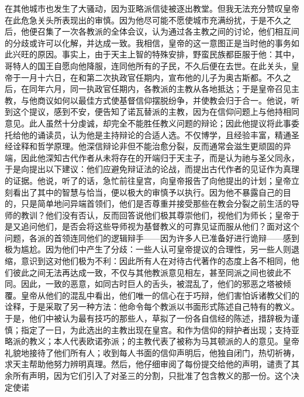 在其他城市也发生了大骚动，因为亚略派信徒被逐出教堂。但我无法充分赞叹皇帝在此危急关头所表现出的审慎。因为他尽可能不愿使城市充满纷扰，于是不久之后，他便召集了一次各教派的全体会议，认为通过各主教之间的讨论，他们相互间的分歧或许可以化解，并达成一致。我相信，皇帝的这一意图正是当时他的事务如此兴旺的原因。事实上，由于天主上智的特殊安排，野蛮民族都臣服于他：其中，哥特人的国王自愿向他降服，连同他所有的子民，不久后便在去世。在此关头，皇帝于一月十六日，在和第二次执政官任期内，宣布他的儿子为奥古斯都。不久之后，在同年六月，同一执政官任期内，各教派的主教从各地抵达；于是皇帝召见主教，与他商议如何以最佳方式使基督信仰摆脱纷争，并使教会归于合一。他说，听到这个提议，感到不安，便告知了诺瓦替派的主教，因为在信仰问题上与他持相同意见。此人虽然十分虔诚，却完全不能胜任教义问题的辩论；因此他提议将此事委托给他的诵读员，认为他是主持辩论的合适人选。不仅博学，且经验丰富，精通圣经诠释和哲学原理。他深信辩论非但不能治愈分裂，反而通常会滋生更顽固的异端，因此他深知古代作者从未将存在的开端归于天主子，而是认为祂与圣父同永，于是向提出以下建议：他们应避免辩证法的论战，而提出古代作者的见证作为真理的证据。他说，听了的话，急忙前往皇宫，向皇帝报告了向他提出的计划；皇帝立刻看出了其中的智慧与恰当，便以极大的审慎予以执行。因为他不暴露自己的目的，只是简单地问异端首领们，他们是否尊重并接受那些在教会分裂之前生活的导师的教训？他们没有否认，反而回答说他们极其尊崇他们，视他们为师长；皇帝于是又追问他们，是否会将这些导师视为基督教义的可靠见证而服从他们？面对这个问题，各派的首领连同他们的逻辑辩手——因为许多人已准备好进行诡辩——感到极为尴尬。因为他们中产生了分歧：一些人认可皇帝提议的合理性，另一些人则退缩，意识到这对他们极为不利：因此所有人在对待古代著作的态度上各不相同，他们彼此之间无法再达成一致，不仅与其他教派意见相左，甚至同派之间也彼此不同。因此，一致的恶意，如同古时巨人的舌头，被混乱了，他们的邪恶之塔被倾覆。皇帝从他们的混乱中看出，他们唯一的信心在于巧辩，他们害怕诉诸教父们的诠释，于是采取了另一种方法：他命令每个教派以书面形式陈述自己特有的教义。于是，他们中被认为最有技巧的那些人，草拟了一份各自信经的陈述，措辞极为谨慎；指定了一日，为此选出的主教出现在皇宫。和作为信仰的辩护者出现；支持亚略派的教义；本人代表欧诺弥派；的主教代表了被称为马其顿派的人的意见。皇帝礼貌地接待了他们所有人；收到每人书面的信仰声明后，他独自闭门，热切祈祷，求天主帮助他努力辨明真理。然后，他仔细审阅了每份提交给他的声明，谴责了其余所有声明，因为它们引入了对圣三的分割，只批准了包含教义的那一份。这个决定使诺